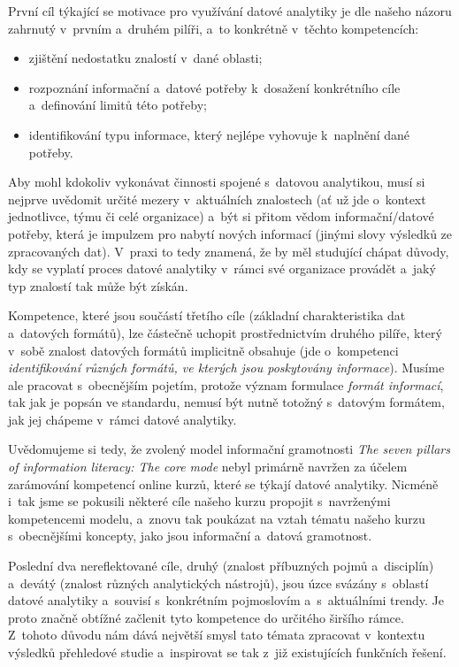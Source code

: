 První cíl týkající se motivace pro využívání datové analytiky je dle našeho názoru zahrnutý v~prvním a~druhém pilíři, a~to konkrétně v~těchto kompetencích:

\begin{itemize}
\tightlist
\item
  zjištění nedostatku znalostí v~dané oblasti;
\item
  rozpoznání informační a~datové potřeby k~dosažení konkrétního cíle a~definování limitů této potřeby;
\item
  identifikování typu informace, který nejlépe vyhovuje k~naplnění dané potřeby.
\end{itemize}

Aby mohl kdokoliv vykonávat činnosti spojené s~datovou analytikou, musí si nejprve uvědomit určité mezery v~aktuálních znalostech (ať už jde o~kontext jednotlivce, týmu či celé organizace) a~být si přitom vědom informační/datové potřeby, která je impulzem pro nabytí nových informací (jinými slovy výsledků ze zpracovaných dat). V~praxi to tedy znamená, že by měl studující chápat důvody, kdy se vyplatí proces datové analytiky v~rámci své organizace provádět a~jaký typ znalostí tak může být získán.

Kompetence, které jsou součástí třetího cíle (základní charakteristika dat a~datových formátů), lze částečně uchopit prostřednictvím druhého pilíře, který v~sobě znalost datových formátů implicitně obsahuje (jde o~kompetenci \emph{identifikování různých formátů, ve kterých jsou poskytovány informace}). Musíme ale pracovat s~obecnějším pojetím, protože význam formulace \emph{formát informací}, tak jak je popsán ve standardu, nemusí být nutně totožný s~datovým formátem, jak jej chápeme v~rámci datové analytiky.

Uvědomujeme si tedy, že zvolený model informační gramotnosti \emph{The seven pillars of information literacy: The core mode} nebyl primárně navržen za účelem zarámování kompetencí online kurzů, které se týkají datové analytiky. Nicméně i~tak jsme se pokusili některé cíle našeho kurzu propojit s~navrženými kompetencemi modelu, a~znovu tak poukázat na vztah tématu našeho kurzu s~obecnějšími koncepty, jako jsou informační a~datová gramotnost.

Poslední dva nereflektované cíle, druhý (znalost příbuzných pojmů a~disciplín) a~devátý (znalost různých analytických nástrojů), jsou úzce svázány s~oblastí datové analytiky a~souvisí s~konkrétním pojmoslovím a~s~aktuálními trendy. Je proto značně obtížné začlenit tyto kompetence do určitého širšího rámce. Z~tohoto důvodu nám dává největší smysl tato témata zpracovat v~kontextu výsledků přehledové studie a~inspirovat se tak z~již existujících funkčních řešení.
